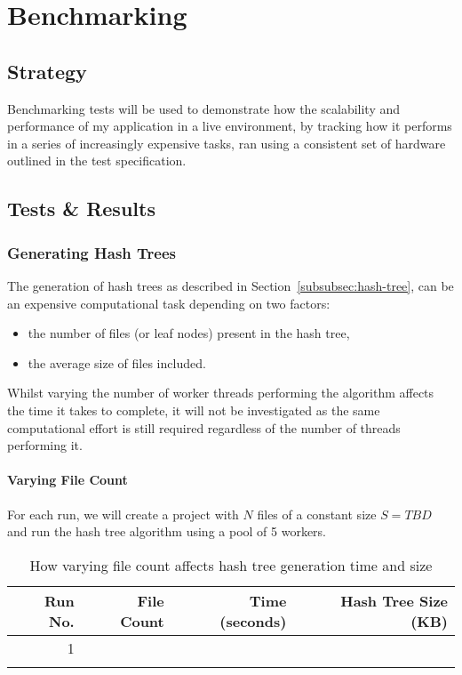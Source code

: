 \section{Benchmarking}\label{sec:benchmark}

\subsection*{Strategy}

Benchmarking tests will be used to demonstrate how the scalability and performance of my application in a live environment, by tracking how it performs in a series of increasingly expensive tasks, ran using a consistent set of hardware outlined in the test specification.

\subsection*{Tests \& Results}

\subsubsection*{Generating Hash Trees}

The generation of hash trees as described in Section~\ref{subsubsec:hash-tree}, can be an expensive computational task depending on two factors:

\begin{itemize}
  \item the number of files (or leaf nodes) present in the hash tree,
  \item the average size of files included.
\end{itemize}

\vspace{1mm}\noindent
Whilst varying the number of worker threads performing the algorithm affects the time it takes to complete, it will not be investigated as the same computational effort is still required regardless of the number of threads performing it.

\paragraph*{Varying File Count}
For each run, we will create a project with $N$ files of a constant size $S=TBD$ and run the hash tree algorithm using a pool of 5 workers.

\begin{longtable}{ | r | r | r | r | }
  \hline
  \textbf{Run No.} & \textbf{File Count} & \textbf{Time (seconds)} & \textbf{Hash Tree Size (KB)}\\\hline
  1
  &
  &
  &
  \\\hline
  \caption{How varying file count affects hash tree generation time and size}
\end{longtable}

